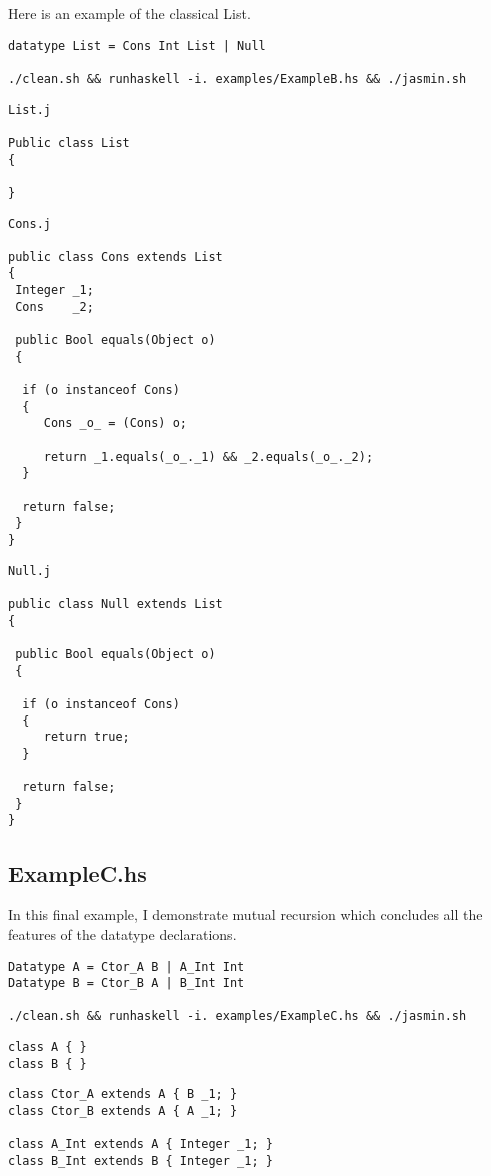 \documentclass{article}
\begin{document}
Here is an example of the classical List.

\begin{verbatim}
datatype List = Cons Int List | Null

./clean.sh && runhaskell -i. examples/ExampleB.hs && ./jasmin.sh
\end{verbatim}

\begin{verbatim}
List.j

Public class List
{

}
\end{verbatim}

\begin{verbatim}
Cons.j

public class Cons extends List
{
 Integer _1;
 Cons    _2; 

 public Bool equals(Object o)
 {

  if (o instanceof Cons)
  {
     Cons _o_ = (Cons) o;
     
     return _1.equals(_o_._1) && _2.equals(_o_._2);
  }
  
  return false;
 }
}
\end{verbatim}

\begin{verbatim}
Null.j

public class Null extends List
{

 public Bool equals(Object o)
 {

  if (o instanceof Cons)
  {
     return true;
  }
  
  return false;
 }
}
\end{verbatim}

\subsection{ExampleC.hs}

In this final example, I demonstrate mutual recursion which concludes all the features of the datatype declarations.

\begin{verbatim}
Datatype A = Ctor_A B | A_Int Int
Datatype B = Ctor_B A | B_Int Int

./clean.sh && runhaskell -i. examples/ExampleC.hs && ./jasmin.sh
\end{verbatim}

\begin{verbatim}
class A { } 
class B { }
\end{verbatim}

\begin{verbatim}
class Ctor_A extends A { B _1; }
class Ctor_B extends A { A _1; }

class A_Int extends A { Integer _1; }
class B_Int extends B { Integer _1; }
\end{verbatim}
\end{document}
